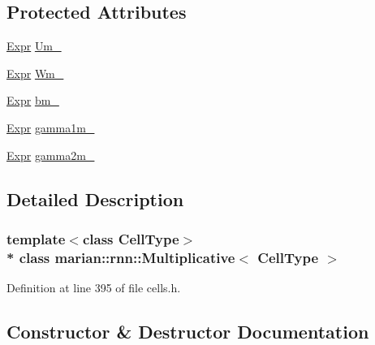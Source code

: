 \subsection*{Protected Attributes}
\begin{DoxyCompactItemize}
\item 
\hyperlink{namespacemarian_a498d8baf75b754011078b890b39c8e12}{Expr} \hyperlink{classmarian_1_1rnn_1_1Multiplicative_a5048c83eb0045b7a85304e3557727e07}{Um\+\_\+}
\item 
\hyperlink{namespacemarian_a498d8baf75b754011078b890b39c8e12}{Expr} \hyperlink{classmarian_1_1rnn_1_1Multiplicative_acea0bc134660ffa076fad2536207fedb}{Wm\+\_\+}
\item 
\hyperlink{namespacemarian_a498d8baf75b754011078b890b39c8e12}{Expr} \hyperlink{classmarian_1_1rnn_1_1Multiplicative_a26cdb5d0561b1958105dbdb56c4ee13f}{bm\+\_\+}
\item 
\hyperlink{namespacemarian_a498d8baf75b754011078b890b39c8e12}{Expr} \hyperlink{classmarian_1_1rnn_1_1Multiplicative_a3708c56833f8a2c5a2a44fea9571ffd7}{gamma1m\+\_\+}
\item 
\hyperlink{namespacemarian_a498d8baf75b754011078b890b39c8e12}{Expr} \hyperlink{classmarian_1_1rnn_1_1Multiplicative_a1984a6776106c31887279d6c60e3874c}{gamma2m\+\_\+}
\end{DoxyCompactItemize}


\subsection{Detailed Description}
\subsubsection*{template$<$class Cell\+Type$>$\\*
class marian\+::rnn\+::\+Multiplicative$<$ Cell\+Type $>$}



Definition at line 395 of file cells.\+h.



\subsection{Constructor \& Destructor Documentation}
